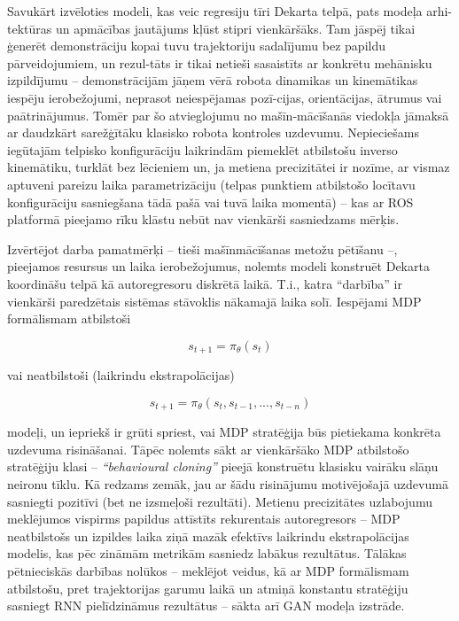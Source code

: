 \documentclass[12pt, a4paper]{article}
\numberwithin{equation}{section} %
\begin{document}
Savukārt izvēloties modeli, kas veic regresiju tīri Dekarta telpā, pats modeļa arhi-tektūras un apmācības jautājums kļūst stipri vienkāršāks. Tam jāspēj tikai ģenerēt demonstrāciju kopai tuvu trajektoriju sadalījumu bez papildu pārveidojumiem, un rezul-tāts ir tikai netieši sasaistīts ar konkrētu mehānisku izpildījumu -- demonstrācijām jāņem vērā robota dinamikas un kinemātikas iespēju ierobežojumi, neprasot neiespējamas pozī-cijas, orientācijas, ātrumus vai paātrinājumus. Tomēr par šo atvieglojumu no mašīn-mācīšanās viedokļa jāmaksā ar daudzkārt sarežģītāku klasisko robota kontroles uzdevumu. Nepieciešams iegūtajām telpisko konfigurāciju laikrindām piemeklēt atbilstošu inverso kinemātiku, turklāt bez lēcieniem un, ja metiena precizitātei ir nozīme, ar vismaz aptuveni pareizu laika parametrizāciju (telpas punktiem atbilstošo locītavu konfigurāciju sasniegšana tādā pašā vai tuvā laika momentā) -- kas ar ROS platformā pieejamo rīku klāstu nebūt nav vienkārši sasniedzams mērķis.

Izvērtējot darba pamatmērķi -- tieši mašīnmācīšanas metožu pētīšanu --, pieejamos resursus un laika ierobežojumus, nolemts modeli konstruēt Dekarta koordināšu telpā kā autoregresoru diskrētā laikā. T.i., katra ``darbība'' ir vienkārši paredzētais sistēmas stāvoklis nākamajā laika solī. Iespējami MDP formālismam atbilstoši


\begin{equation}
    s_{t+1} = \pi_{\theta}(s_t)
\end{equation}

vai neatbilstoši (laikrindu ekstrapolācijas)

\begin{equation}
    s_{t+1} = \pi_{\theta}(s_t, s_{t-1}, ..., s_{t-n})
\end{equation}

modeļi, un iepriekš ir grūti spriest, vai MDP stratēģija būs pietiekama konkrēta uzdevuma risināšanai. Tāpēc nolemts sākt ar vienkāršāko MDP atbilstošo stratēģiju klasi -- \textit{``behavioural cloning''} pieejā konstruētu klasisku vairāku slāņu neironu tīklu. Kā redzams zemāk, jau ar šādu risinājumu motivējošajā uzdevumā sasniegti pozitīvi (bet ne izsmeļoši rezultāti). Metienu precizitātes uzlabojumu meklējumos vispirms papildus attīstīts rekurentais autoregresors -- MDP neatbilstošs un izpildes laika ziņā mazāk efektīvs laikrindu ekstrapolācijas modelis, kas pēc zināmām metrikām sasniedz labākus rezultātus. Tālākas pētnieciskās darbības nolūkos -- meklējot veidus, kā ar MDP formālismam atbilstošu, pret trajektorijas garumu laikā un atmiņā konstantu stratēģiju sasniegt RNN pielīdzināmus rezultātus -- sākta arī GAN modeļa izstrāde.
\end{document}
